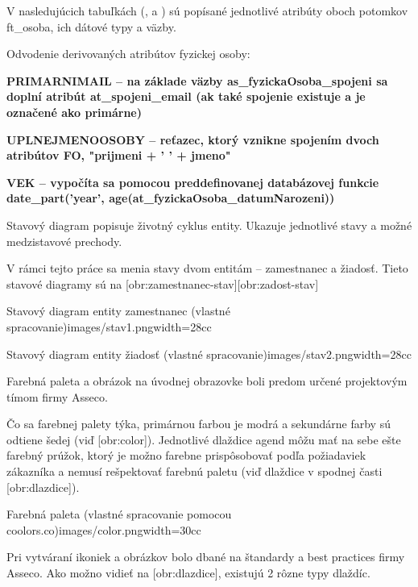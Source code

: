 V nasledujúcich tabuľkách (\in[tab:FO1], \in[tab:PO1] a ) sú popísané jednotlivé atribúty oboch potomkov ft_osoba, ich dátové typy a väzby.

Odvodenie derivovaných atribútov fyzickej osoby: %



\startitemize
\item {\start\bf PRIMARNIMAIL \stop -- na základe väzby as_fyzickaOsoba_spojeni sa doplní atribút at_spojeni_email (ak také spojenie existuje a je označené ako primárne)}
\item {\start\bf UPLNEJMENOOSOBY \stop -- reťazec, ktorý vznikne spojením dvoch atribútov FO, "prijmeni + ' ' + jmeno"}
\item {\start\bf VEK \stop -- vypočíta sa pomocou preddefinovanej databázovej funkcie \zlom date_part('year', age(at_fyzickaOsoba_datumNarozeni)) }
\stopitemize


Stavový diagram popisuje životný cyklus entity. Ukazuje jednotlivé stavy a možné medzistavové prechody.

V rámci tejto práce sa menia stavy dvom entitám -- zamestnanec a žiadosť. Tieto stavové diagramy sú na [obr:zamestnanec-stav][obr:zadost-stav]

{Stavový diagram entity zamestnanec (vlastné spracovanie)}{images/stav1.png}{width=28cc} 


{Stavový diagram entity žiadosť (vlastné spracovanie)}{images/stav2.png}{width=28cc} 

Farebná paleta a obrázok na úvodnej obrazovke boli predom určené projektovým tímom firmy Asseco.

Čo sa farebnej palety týka, primárnou farbou je modrá a sekundárne farby sú odtiene šedej (viď [obr:color]). Jednotlivé dlaždice agend môžu mať na sebe ešte farebný prúžok, ktorý je možno farebne prispôsobovať podľa požiadaviek zákazníka a nemusí rešpektovať farebnú paletu (viď dlaždice v spodnej časti [obr:dlazdice]).

{Farebná paleta (vlastné spracovanie pomocou coolors.co)}{images/color.png}{width=30cc} 

Pri vytváraní ikoniek a obrázkov bolo dbané na štandardy a best practices firmy Asseco. Ako možno vidieť na [obr:dlazdice], existujú 2 rôzne typy dlaždíc. 

